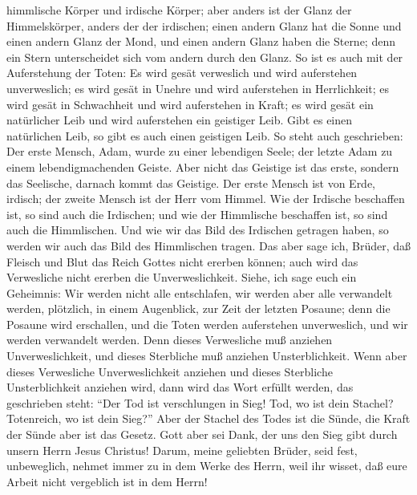 himmlische Körper und irdische Körper; aber anders ist der Glanz der
Himmelskörper, anders der der irdischen;  einen andern
Glanz hat die Sonne und einen andern Glanz der Mond, und einen andern
Glanz haben die Sterne; denn ein Stern unterscheidet sich vom andern
durch den Glanz.  So ist es auch mit der Auferstehung der
Toten: Es wird gesät verweslich und wird auferstehen unverweslich;
 es wird gesät in Unehre und wird auferstehen in
Herrlichkeit; es wird gesät in Schwachheit und wird auferstehen in
Kraft;  es wird gesät ein natürlicher Leib und wird
auferstehen ein geistiger Leib. Gibt es einen natürlichen Leib, so gibt
es auch einen geistigen Leib.  So steht auch geschrieben:
Der erste Mensch, Adam, wurde zu einer lebendigen Seele; der letzte Adam
zu einem lebendigmachenden Geiste.  Aber nicht das
Geistige ist das erste, sondern das Seelische, darnach kommt das
Geistige.  Der erste Mensch ist von Erde, irdisch; der
zweite Mensch ist der Herr vom Himmel.  Wie der Irdische
beschaffen ist, so sind auch die Irdischen; und wie der Himmlische
beschaffen ist, so sind auch die Himmlischen.  Und wie
wir das Bild des Irdischen getragen haben, so werden wir auch das Bild
des Himmlischen tragen.  Das aber sage ich, Brüder, daß
Fleisch und Blut das Reich Gottes nicht ererben können; auch wird das
Verwesliche nicht ererben die Unverweslichkeit.  Siehe,
ich sage euch ein Geheimnis: Wir werden nicht alle entschlafen, wir
werden aber alle verwandelt werden,  plötzlich, in einem
Augenblick, zur Zeit der letzten Posaune; denn die Posaune wird
erschallen, und die Toten werden auferstehen unverweslich, und wir
werden verwandelt werden.  Denn dieses Verwesliche muß
anziehen Unverweslichkeit, und dieses Sterbliche muß anziehen
Unsterblichkeit.  Wenn aber dieses Verwesliche
Unverweslichkeit anziehen und dieses Sterbliche Unsterblichkeit anziehen
wird, dann wird das Wort erfüllt werden, das geschrieben steht:
 ``Der Tod ist verschlungen in Sieg! Tod, wo ist dein
Stachel? Totenreich, wo ist dein Sieg?''  Aber der
Stachel des Todes ist die Sünde, die Kraft der Sünde aber ist das
Gesetz.  Gott aber sei Dank, der uns den Sieg gibt durch
unsern Herrn Jesus Christus!  Darum, meine geliebten
Brüder, seid fest, unbeweglich, nehmet immer zu in dem Werke des Herrn,
weil ihr wisset, daß eure Arbeit nicht vergeblich ist in dem Herrn!

